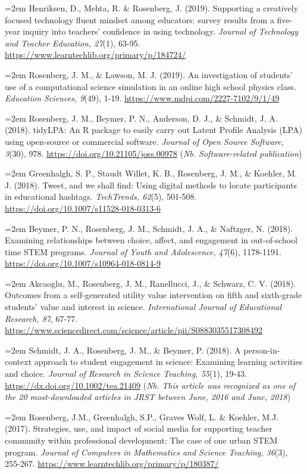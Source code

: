 \documentclass[14,]{article}
\begin{document}
\hangindent=2em Henriksen, D., Mehta, R. \& Rosenberg, J. (2019).
Supporting a creatively focused technology fluent mindset among
educators: survey results from a five-year inquiry into teachers'
confidence in using technology. \emph{Journal of Technology and Teacher
Education, 27}(1), 63-95.
\url{https://www.learntechlib.org/primary/p/184724/}

\hangindent=2em Rosenberg, J. M., \& Lawson, M. J. (2019). An
investigation of students' use of a computational science simulation in
an online high school physics class. \emph{Education Sciences, 9}(49),
1-19. \url{https://www.mdpi.com/2227-7102/9/1/49}

\hangindent=2em Rosenberg, J. M., Beymer, P. N., Anderson, D. J., \&
Schmidt, J. A. (2018). tidyLPA: An R package to easily carry out Latent
Profile Analysis (LPA) using open-source or commercial software.
\emph{Journal of Open Source Software, 3}(30), 978.
\url{https://doi.org/10.21105/joss.00978} (\emph{Nb. Software-related
publication})

\hangindent=2em Greenhalgh, S. P., Staudt Willet, K. B., Rosenberg, J.
M., \& Koehler, M. J. (2018). Tweet, and we shall find: Using digital
methods to locate participants in educational hashtags.
\emph{TechTrends, 62}(5), 501-508.
\url{https://doi.org/10.1007/s11528-018-0313-6}

\hangindent=2em Beymer, P. N., Rosenberg, J. M., Schmidt, J. A., \&
Naftzger, N. (2018). Examining relationships between choice, affect, and
engagement in out-of-school time STEM programs. \emph{Journal of Youth
and Adolescence, 47}(6), 1178-1191.
\url{https://doi.org/10.1007/s10964-018-0814-9}

\hangindent=2em Akcaoglu, M., Rosenberg, J. M., Ranellucci, J., \&
Schwarz, C. V. (2018). Outcomes from a self-generated utility value
intervention on fifth and sixth-grade students' value and interest in
science. \emph{International Journal of Educational Research, 87},
67-77.
\url{https://www.sciencedirect.com/science/article/pii/S0883035517308492}

\hangindent=2em Schmidt, J. A., Rosenberg, J. M., \& Beymer, P. (2018).
A person-in-context approach to student engagement in science: Examining
learning activities and choice. \emph{Journal of Research in Science
Teaching, 55}(1), 19-43. \url{https://dx.doi.org/10.1002/tea.21409}
(\emph{Nb. This article was recognized as one of the 20 most-downloaded
articles in JRST between June, 2016 and June, 2018})

\hangindent=2em Rosenberg, J.M., Greenhalgh, S.P., Graves Wolf, L. \&
Koehler, M.J. (2017). Strategies, use, and impact of social media for
supporting teacher community within professional development: The case
of one urban STEM program. \emph{Journal of Computers in Mathematics and
Science Teaching, 36}(3), 255-267.
\url{https://www.learntechlib.org/primary/p/180387/}
\end{document}
